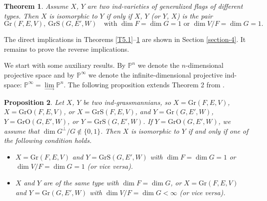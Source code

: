 \documentclass[12pt]{amsart}
\newcommand{\Grass}{\mathrm{Gr}}
\newcommand{\OGrass}{\mathrm{GrO}}
\newcommand{\SGrass}{\mathrm{GrS}}
\newtheorem{theorem}{Theorem}[section]
\newtheorem{proposition}[theorem]{Proposition}
\theoremstyle{definition}
\begin{document}
\begin{theorem}
\label{T5.2}
Assume $X$, $Y$ are two ind-varieties of generalized flags of different types.
Then $X$ is isomorphic to $Y$ if only if $X$, $Y$ (or $Y$, $X$) is the pair 
\begin{equation}
\label{newequation2}
\Grass(F,E,V),\ \SGrass(G,E',W)\quad\mbox{with $\dim F=\dim G=1$ or $\dim V/F=\dim G=1$}.
\end{equation}
\end{theorem}

The direct implications in Theorems \ref{T5.1}--\ref{T5.2} are shown in Section \ref{section-4}. It remains to prove the reverse implications.

We start with some auxiliary results. 
By $\mathbb{P}^n$ we denote the $n$-dimensional projective space and by $\mathbb{P}^\infty$ we denote the infinite-dimensional projective ind-space: $\mathbb{P}^\infty=\lim\limits_\to\mathbb{P}^n$.
The following proposition extends Theorem 2 from \cite{PT1}.

\begin{proposition}
\label{P5.3}
Let $X$, $Y$ be two ind-grassmannians, so $X=\Grass(F,E,V)$, $X=\OGrass(F,E,V)$, or $X=\SGrass(F,E,V)$, and $Y=\Grass(G,E',W)$, $Y=\OGrass(G,E',W)$, or $Y=\SGrass(G,E',W)$.
If $Y=\OGrass(G,E',W)$, we assume that  $\dim G^\perp/G\notin\{0,1\}$.
Then $X$ is isomorphic to $Y$ if and only if one of the following condition holds.
\begin{itemize}
\item[(A)] $X=\Grass(F,E,V)$ and $Y=\SGrass(G,E',W)$ with $\dim F=\dim G=1$ or $\dim V/F=\dim G=1$ (or vice versa).
\item[(B)] $X$ and $Y$ are of the same type with $\dim F=\dim G$, or $X=\Grass(F,E,V)$ and $Y=\Grass(G,E',W)$ with $\dim V/F=\dim G<\infty$ (or vice versa).
\end{itemize}
\end{proposition}
\end{document}

